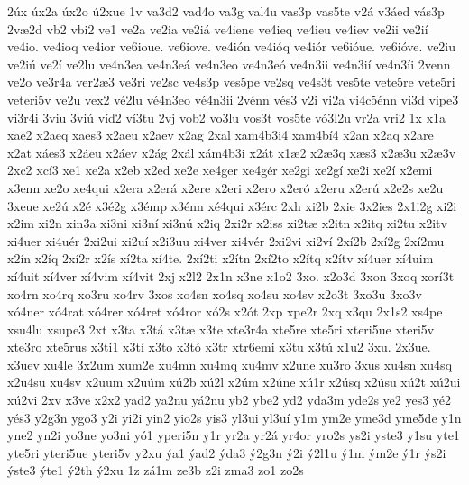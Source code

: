 {2^^fax
^^fax2a
^^fax2o
^^fa2xue
1v
va3d2
vad4o
va3g
val4u
vas3p
vas5te
v2^^e1
v3^^e1ed
v^^e1s3p
2v^^e62d
vb2
vbi2
ve1
ve2a
ve2ia
ve2i^^e1
ve4iene
ve4ieq
ve4ieu
ve4iev
ve2ii
ve2i^^ed
ve4io.
ve4ioq
ve4ior
ve6ioue.
ve6iove.
ve4i^^f3n
ve4i^^f3q
ve4i^^f3r
ve6i^^f3ue.
ve6i^^f3ve.
ve2iu
ve2i^^fa
ve2^^ed
ve2lu
ve4n3ea
ve4n3e^^e1
ve4n3eo
ve4n3e^^f3
ve4n3ii
ve4n3i^^ed
ve4n3^^edi
2venn
ve2o
ve3r4a
ver2^^e63
ve3ri
ve2sc
ve4s3p
ves5pe
ve2sq
ve4s3t
ves5te
vete5re
vete5ri
veteri5v
ve2u
vex2
v^^e92lu
v^^e94n3eo
v^^e94n3ii
2v^^e9nn
v^^e9s3
v2i
vi2a
vi4c5^^e9nn
vi3d
vipe3
vi3r4i
3viu
3vi^^fa
v^^edd2
v^^ed3tu
2vj
vob2
vo3lu
vos3t
vos5te
v^^f33l2u
vr2a
vri2
1x
x1a
xae2
x2aeq
xaes3
x2aeu
x2aev
x2ag
2xal
xam4b3i4
xam4b^^ed4
x2an
x2aq
x2are
x2at
x^^e1es3
x2^^e1eu
x2^^e1ev
x2^^e1g
2x^^e1l
x^^e1m4b3i
x2^^e1t
x1^^e62
x2^^e63q
x^^e6s3
x2^^e63u
x2^^e63v
2xc2
xc^^ed3
xe1
xe2a
x2eb
x2ed
xe2e
xe4ger
xe4g^^e9r
xe2gi
xe2g^^ed
xe2i
xe2^^ed
x2emi
x3enn
xe2o
xe4qui
x2era
x2er^^e1
x2ere
x2eri
x2ero
x2er^^f3
x2eru
x2er^^fa
x2e2s
xe2u
3xeue
xe2^^fa
x2^^e9
x3^^e92g
x3^^e9mp
x3^^e9nn
x^^e94qui
x3^^e9rc
2xh
xi2b
2xie
3x2ies
2x1i2g
xi2i
x2im
xi2n
xin3a
xi3ni
xi3n^^ed
xi3n^^fa
x2iq
2xi2r
x2iss
xi2t^^e6
x2itn
x2itq
xi2tu
x2itv
xi4uer
xi4u^^e9r
2xi2ui
xi2u^^ed
x2i3uu
xi4ver
xi4v^^e9r
2xi2vi
xi2v^^ed
2x^^ed2b
2x^^ed2g
2x^^ed2mu
x2^^edn
x2^^edq
2x^^ed2r
x2^^eds
x^^ed2ta
x^^ed4te.
2x^^ed2ti
x2^^edtn
2x^^ed2to
x2^^edtq
x2^^edtv
x^^ed4uer
x^^ed4uim
x^^ed4uit
x^^ed4ver
x^^ed4vim
x^^ed4vit
2xj
x2l2
2x1n
x3ne
x1o2
3xo.
x2o3d
3xon
3xoq
xor^^ed3t
xo4rn
xo4rq
xo3ru
xo4rv
3xos
xo4sn
xo4sq
xo4su
xo4sv
x2o3t
3xo3u
3xo3v
x^^f34ner
x^^f34rat
x^^f34rer
x^^f34ret
x^^f34ror
x^^f32s
x2^^f3t
2xp
xpe2r
2xq
x3qu
2x1s2
xs4pe
xsu4lu
xsupe3
2xt
x3ta
x3t^^e1
x3t^^e6
x3te
xte3r4a
xte5re
xte5ri
xteri5ue
xteri5v
xte3ro
xte5rus
x3ti1
x3t^^ed
x3to
x3t^^f3
x3tr
xtr6emi
x3tu
x3t^^fa
x1u2
3xu.
2x3ue.
x3uev
xu4le
3x2um
xum2e
xu4mn
xu4mq
xu4mv
x2une
xu3ro
3xus
xu4sn
xu4sq
x2u4su
xu4sv
x2uum
x2u^^fam
x^^fa2b
x^^fa2l
x2^^fam
x2^^fane
x^^fa1r
x2^^fasq
x2^^fasu
x^^fa2t
x^^fa2ui
x^^fa2vi
2xv
x3ve
x2x2
yad2
ya2nu
y^^e12nu
yb2
ybe2
yd2
yda3m
yde2s
ye2
yes3
y^^e92
y^^e9s3
y2g3n
ygo3
y2i
yi2i
yin2
yio2s
yis3
yl3ui
yl3u^^ed
y1m
ym2e
yme3d
yme5de
y1n
yne2
yn2i
yo3ne
yo3ni
y^^f31
yperi5n
y1r
yr2a
yr2^^e1
yr4or
yro2s
ys2i
yste3
y1su
yte1
yte5ri
yteri5ue
yteri5v
y2xu
^^fda1
^^fdad2
^^fdda3
^^fd2g3n
^^fd2i
^^fd2l1u
^^fd1m
^^fdm2e
^^fd1r
^^fds2i
^^fdste3
^^fdte1
^^fd2th
^^fd2xu
1z
z^^e11m
ze3b
z2i
zma3
zo1
zo2s
}
\egroup
